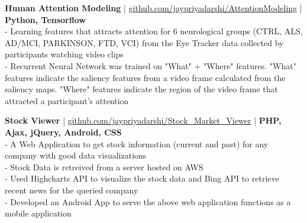 \item \textbf{Human Attention Modeling} | \href{https://github.com/jaypriyadarshi/AttentionModeling}{github.com/jaypriyadarshi/AttentionModeling} | \textbf{Python, Tensorflow}\\
 - Learning features that attracts attention for 6 neurological groups (CTRL, ALS, AD/MCI, PARKINSON, FTD, VCI) from the Eye Tracker data collected by participants watching video clips\\
 - Recurrent Neural Network was trained on "What" + "Where" features. "What" features indicate the saliency features from a video frame calculated from the saliency maps. "Where" features indicate the region of the video frame that attracted a participant's attention
 
  \item \textbf{Stock Viewer} | \href{https://github.com/jaypriyadarshi/Stock_Market_Viewer}{github.com/jaypriyadarshi/Stock\_Market\_Viewer} | \textbf{PHP, Ajax, jQuery, Android, CSS}\\
 - A Web Application to get stock information (current and past) for any company with good data visualizations\\
 - Stock Data is retreived from a server hosted on AWS\\
 - Used Highcharts API to visualize the stock data and Bing API to retrieve recent news for the queried company\\
 - Developed an Android App to serve the above web application functions as a mobile application
